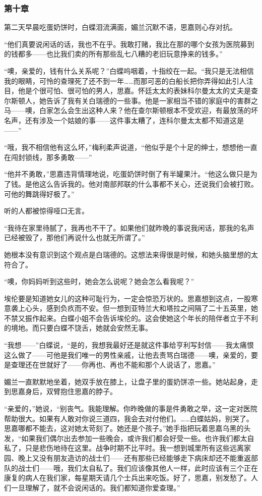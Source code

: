 \subsubsection{第十章}



\par 第二天早晨吃蛋奶饼时，白蝶泪流满面，媚兰沉默不语，思嘉则心存对抗。
\par “他们真要说闲话的话，我也不在乎。我敢打赌，我比在那的哪个女孩为医院募到的钱都多——也比我们卖的所有那些乱七八糟的老旧玩意挣来的钱多。”
\par “噢，亲爱的，钱有什么关系呢？”白蝶呜咽着，十指绞在一起。“我只是无法相信我的眼睛，可怜的查理死了还不到一年……而那可恶的白船长把你弄得如此引人注目，他是个很可怕、很可怕的男人，思嘉。怀廷太太的表妹科尔曼太太的丈夫是查尔斯顿人，她告诉了我有关白瑞德的一些事。他是一家相当不错的家庭中的害群之马——噢，白家怎么会生出这种人来？他在查尔斯顿根本不受欢迎，有最放荡的坏名声，还有涉及一个姑娘的事——这件事太糟了，连科尔曼太太都不知道这是——”
\par “哦，我不相信他有这么坏，”梅利柔声说道，“他似乎是个十足的绅士，想想他一直在闯封锁线，那多勇敢——”
\par “他并不勇敢，”思嘉违背情理地说，吃蛋奶饼时倒了有半罐果汁。“他这么做只是为了钱。是他这么告诉我的。他对南部邦联的什么事都不关心，还说我们会被打败。可他的舞跳得好极了。”
\par 听的人都被惊得哑口无言。
\par “我待在家里待腻了，我再也不干了。如果他们就昨晚的事说我闲话，那我的名声已经被毁了，那他们再说什么也就无所谓了。”
\par 她根本没有意识到这个观点是白瑞德的。这想法来得很是时候，和她头脑里想的太符合了。
\par “噢，你妈妈听到这些时，她会怎么说呢？她会怎么看我呢？”
\par 埃伦要是知道她女儿的这种可耻行为，一定会惊恐万状的。思嘉想到这点，一股寒意袭上心头，感到负疚而不安。但一想到亚特兰大和塔拉之间隔了二十五英里，她不禁又振作起来。白蝶小姐不会告诉埃伦的。这会使她这个年长的陪伴者立于不利的境地。而只要白蝶不饶舌，她就会安然无事。
\par “我想——”白蝶说，“是的，我想我最好还是就这件事给亨利写封信——我太痛恨这么做了——可他是我们唯一的男性亲戚，让他去责骂白瑞德——噢，亲爱的，要是查理还在世就好了——你再也、再也不能和那个人说话了，思嘉。”
\par 媚兰一直默默地坐着，她双手放在膝上，让盘子里的蛋奶饼凉一些。她站起身，走到思嘉身后，双臂抱住思嘉的脖子。
\par “亲爱的，”她说，“别丧气。我能理解。你昨晚做的事是件勇敢之举，这一定对医院帮助很大。如果有人敢对你说三道四，我会去对付他们。……白蝶姑妈，别哭了。思嘉哪都不能去，这对她太苛刻了。她还是个孩子。”她手指把玩着思嘉乌黑的头发，“如果我们偶尔出去参加一些晚会，或许我们都会好受一些。也许我们都太自私了，只是悲伤地待在这里。战争时期不比平时。我一想到城里所有这些远离家园、晚上又没有朋友造访的战士们——还有那些已经能够走下病床却还不能重返部队的战士们——哦，我们太自私了。我们应该像其他人一样，此时应该有三个正在康复的病人在我们家，每星期天请几个士兵出来吃饭。好了，思嘉，别发愁了。人们一旦理解了，就不会说闲话的。我们都知道你爱查理。”
